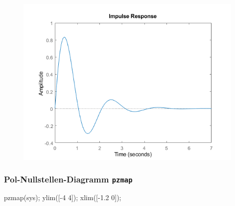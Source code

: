 \documentclass[
  10pt,
  a4paper,
  twocolumn]{article}
\newenvironment{Shaded}{}{}
\newcommand{\FloatTok}[1]{\textcolor[rgb]{0.00,0.36,0.77}{#1}}
\newcommand{\NormalTok}[1]{\textcolor[rgb]{0.14,0.16,0.18}{#1}}
\newcommand{\OperatorTok}[1]{\textcolor[rgb]{0.14,0.16,0.18}{#1}}
\newcommand{\VariableTok}[1]{\textcolor[rgb]{0.89,0.38,0.04}{#1}}
\numberwithin{equation}{section}
\begin{document}
\begin{figure}[H]

{\centering \includegraphics{images/matlab_ImpulseResponsePlot.png}

}

\end{figure}

\hypertarget{pol-nullstellen-diagramm-pzmap}{%
\subsubsection{\texorpdfstring{Pol-Nullstellen-Diagramm
\texttt{pzmap}}{Pol-Nullstellen-Diagramm pzmap}}\label{pol-nullstellen-diagramm-pzmap}}

\begin{Shaded}
\begin{Highlighting}[]
\VariableTok{pzmap}\NormalTok{(}\VariableTok{sys}\NormalTok{)}\OperatorTok{;}
\VariableTok{ylim}\NormalTok{([}\OperatorTok{{-}}\FloatTok{4} \FloatTok{4}\NormalTok{])}\OperatorTok{;} \VariableTok{xlim}\NormalTok{([}\OperatorTok{{-}}\FloatTok{1.2} \FloatTok{0}\NormalTok{])}\OperatorTok{;}
\end{Highlighting}
\end{Shaded}
\end{document}

